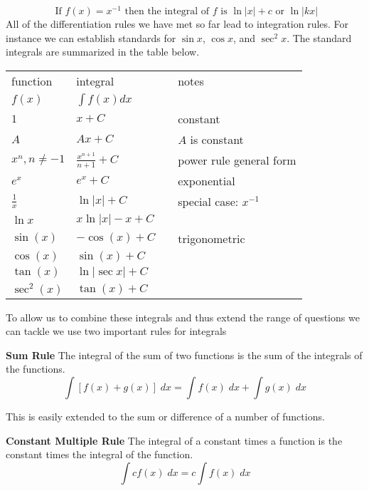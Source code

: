 \begin{equation*}\text{ If }f (x) =x^{ -1}\text{ then the integral of }f\text{ is }\ln  \left \vert x\right \vert  +c\text{ or }\ln  \left \vert k x\right \vert
\end{equation*}
All of the differentiation rules we have met so far lead to integration rules. For instance we can establish standards for $\sin  x$, $\cos  x$, and $\sec ^{2} x\text{.}$ The standard integrals are summarized in the table below.
\renewcommand\arraystretch{1.5}
\begin{center}
	\begin{tabular}{llcl}
		\toprule
		function&integral&&notes\\
		$f(x)$  &  $\int f(x)dx$ \\ \midrule
		$1$&$x+C$&&constant\\
		$A$&$Ax+C$&&$A$ is constant\\
		$x^n, n \neq -1$ & $\displaystyle\frac{x^{n+1}}{n+1}+C$&&power rule general form\\ 
		$e^x$ & $e^x+C$&&exponential\\ 
		$\frac{1}{x}$ & $\ln|x|+C$&&special case: $x^{-1}$\\
		$\ln x$&$x\ln |x|-x+C$&&\\\midrule
		$\sin(x)$ & $-\cos(x)+C$&& trigonometric \\ 
		$\cos(x)$ & $\sin(x)+C$\\ 
		$\tan (x)$&$\ln |\sec x|+C$\\
		$\sec^2(x)$ & $\tan(x)+C$ \\ \bottomrule
	\end{tabular}
\end{center}

To allow us to combine these integrals and thus extend the range of questions we can tackle we use two important rules for integrals 
\begin{tcolorbox}
\textbf{Sum Rule} The integral of the sum of two functions is the sum of the integrals of the functions.
\[\int \left [f (x) +g (x)\right ]\; d x =\int f (x)\; d x +\int g (x)\; d x\]
\end{tcolorbox}
This is easily extended to the sum or difference of a number of functions. 
\begin{tcolorbox}
\textbf{Constant Multiple Rule} The integral of a constant times a function is the constant times the integral of the function.
\[\int c f (x)\; d x =c \int f (x)\; d x
\]\end{tcolorbox}

